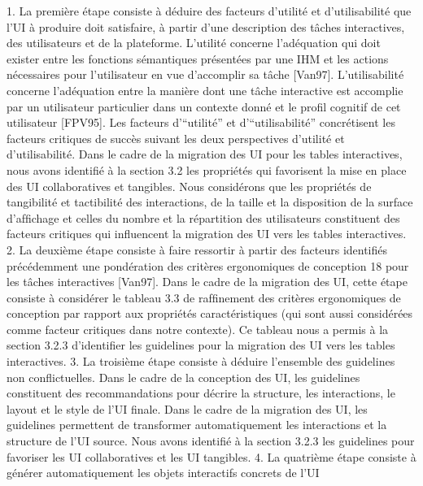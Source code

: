 \documentclass{article}
\begin{document}
1. La premi\`{e}re \'{e}tape consiste \`{a} d\'{e}duire des facteurs d’utilit\'{e} et d’utilisabilit\'{e} que l’UI \`{a} produire doit satisfaire, \`{a} partir d’une description des t\^{a}ches interactives, des utilisateurs et de
la plateforme. L’utilit\'{e} concerne l’ad\'{e}quation qui doit exister entre les fonctions s\'{e}mantiques
pr\'{e}sent\'{e}es par une IHM et les actions n\'{e}cessaires pour l’utilisateur en vue d’accomplir sa
t\^{a}che [Van97]. L’utilisabilit\'{e} concerne l’ad\'{e}quation entre la mani\`{e}re dont une t\^{a}che interactive est accomplie par un utilisateur particulier dans un contexte donn\'{e} et le proﬁl cognitif de
cet utilisateur [FPV95]. Les facteurs d’“utilit\'{e}” et d’“utilisabilit\'{e}” concr\'{e}tisent les facteurs critiques de succ\`{e}s suivant les deux perspectives d’utilit\'{e} et d’utilisabilit\'{e}. Dans le cadre de la
migration des UI pour les tables interactives, nous avons identiﬁ\'{e} \`{a} la section 3.2 les propri\'{e}t\'{e}s
qui favorisent la mise en place des UI collaboratives et tangibles. Nous consid\'{e}rons que les
propri\'{e}t\'{e}s de tangibilit\'{e} et tactibilit\'{e} des interactions, de la taille et la disposition de la surface d’afﬁchage et celles du nombre et la r\'{e}partition des utilisateurs constituent des facteurs
critiques qui inﬂuencent la migration des UI vers les tables interactives.
2. La deuxi\`{e}me \'{e}tape consiste \`{a} faire ressortir \`{a} partir des facteurs identiﬁ\'{e}s pr\'{e}c\'{e}demment une
pond\'{e}ration des crit\`{e}res ergonomiques de conception 18 pour les t\^{a}ches interactives [Van97].
Dans le cadre de la migration des UI, cette \'{e}tape consiste \`{a} consid\'{e}rer le tableau 3.3 de rafﬁnement des crit\`{e}res ergonomiques de conception par rapport aux propri\'{e}t\'{e}s caract\'{e}ristiques (qui
sont aussi consid\'{e}r\'{e}es comme facteur critiques dans notre contexte). Ce tableau nous a permis
\`{a} la section 3.2.3 d’identiﬁer les guidelines pour la migration des UI vers les tables interactives.
3. La troisi\`{e}me \'{e}tape consiste \`{a} d\'{e}duire l’ensemble des guidelines non conﬂictuelles. Dans le cadre
de la conception des UI, les guidelines constituent des recommandations pour d\'{e}crire la structure, les interactions, le layout et le style de l’UI ﬁnale. Dans le cadre de la migration des UI, les
guidelines permettent de transformer automatiquement les interactions et la structure de l’UI
source. Nous avons identiﬁ\'{e} \`{a} la section 3.2.3 les guidelines pour favoriser les UI collaboratives
et les UI tangibles.
4. La quatri\`{e}me \'{e}tape consiste \`{a} g\'{e}n\'{e}rer automatiquement les objets interactifs concrets de l’UI
\end{document}
